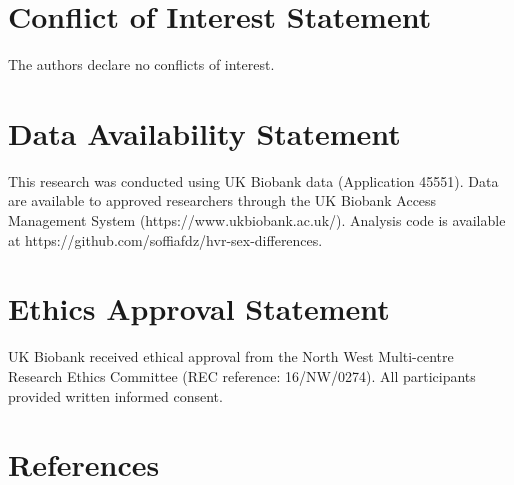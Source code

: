 \documentclass[
]{article}
\begin{document}
\section*{Conflict of Interest
Statement}\label{conflict-of-interest-statement}

The authors declare no conflicts of interest.

\section*{Data Availability
Statement}\label{data-availability-statement}

This research was conducted using UK Biobank data (Application 45551).
Data are available to approved researchers through the UK Biobank Access
Management System (https://www.ukbiobank.ac.uk/). Analysis code is
available at https://github.com/soffiafdz/hvr-sex-differences.

\section*{Ethics Approval Statement}\label{ethics-approval-statement}

UK Biobank received ethical approval from the North West Multi-centre
Research Ethics Committee (REC reference: 16/NW/0274). All participants
provided written informed consent.

\section*{References}\label{references}
\end{document}
